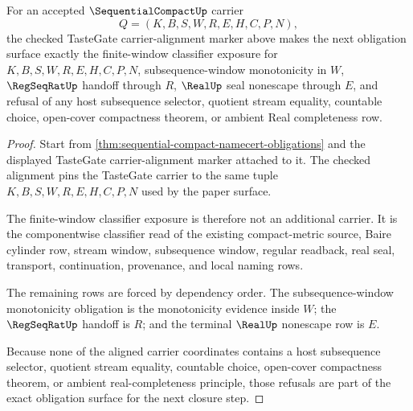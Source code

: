 \begin{theorem}
\label{thm:sequential-compact-obligation-readiness}
For an accepted $\SequentialCompactUp$ carrier
$$
Q=(K,B,S,W,R,E,H,C,P,N),
$$
the checked TasteGate carrier-alignment marker above makes the next obligation surface exactly the finite-window classifier exposure for $K,B,S,W,R,E,H,C,P,N$, subsequence-window monotonicity in $W$, $\RegSeqRatUp$ handoff through $R$, $\RealUp$ seal nonescape through $E$, and refusal of any host subsequence selector, quotient stream equality, countable choice, open-cover compactness theorem, or ambient Real completeness row.
\end{theorem}
\begin{proof}
Start from \autoref{thm:sequential-compact-namecert-obligations} and the displayed TasteGate carrier-alignment marker attached to it. The checked alignment pins the TasteGate carrier to the same tuple $K,B,S,W,R,E,H,C,P,N$ used by the paper surface.

The finite-window classifier exposure is therefore not an additional carrier. It is the componentwise classifier read of the existing compact-metric source, Baire cylinder row, stream window, subsequence window, regular readback, real seal, transport, continuation, provenance, and local naming rows.

The remaining rows are forced by dependency order. The subsequence-window monotonicity obligation is the monotonicity evidence inside $W$; the $\RegSeqRatUp$ handoff is $R$; and the terminal $\RealUp$ nonescape row is $E$.

Because none of the aligned carrier coordinates contains a host subsequence selector, quotient stream equality, countable choice, open-cover compactness theorem, or ambient real-completeness principle, those refusals are part of the exact obligation surface for the next closure step.
\end{proof}

